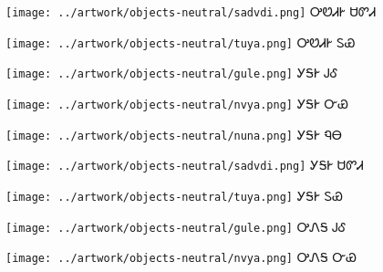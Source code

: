 \documentclass[avery5371]{flashcards}%
\begin{document}
\begin{flashcard}{
\texttt{[image: ../artwork/objects-neutral/sadvdi.png]}
}\Huge ᎤᏬᏗᎨ ᏌᏛᏗ
\end{flashcard}

\begin{flashcard}{
\texttt{[image: ../artwork/objects-neutral/tuya.png]}
}\Huge ᎤᏬᏗᎨ ᏚᏯ
\end{flashcard}

\begin{flashcard}{
\texttt{[image: ../artwork/objects-neutral/gule.png]}
}\Huge ᎩᎦᎨ ᎫᎴ
\end{flashcard}

\begin{flashcard}{
\texttt{[image: ../artwork/objects-neutral/nvya.png]}
}\Huge ᎩᎦᎨ ᏅᏯ
\end{flashcard}

\begin{flashcard}{
\texttt{[image: ../artwork/objects-neutral/nuna.png]}
}\Huge ᎩᎦᎨ ᏄᎾ
\end{flashcard}

\begin{flashcard}{
\texttt{[image: ../artwork/objects-neutral/sadvdi.png]}
}\Huge ᎩᎦᎨ ᏌᏛᏗ
\end{flashcard}

\begin{flashcard}{
\texttt{[image: ../artwork/objects-neutral/tuya.png]}
}\Huge ᎩᎦᎨ ᏚᏯ
\end{flashcard}

\begin{flashcard}{
\texttt{[image: ../artwork/objects-neutral/gule.png]}
}\Huge ᎤᏁᎦ ᎫᎴ
\end{flashcard}

\begin{flashcard}{
\texttt{[image: ../artwork/objects-neutral/nvya.png]}
}\Huge ᎤᏁᎦ ᏅᏯ
\end{flashcard}
\end{document}
